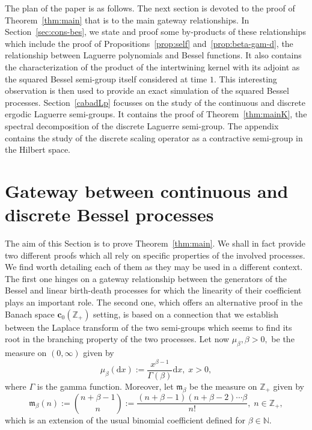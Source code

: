 \documentclass[10pt]{amsart}
\theoremstyle{definition}\newtheorem{defi}[theo]{Definition}\newtheorem{rema}[theo]{Remark}\newtheorem{exam}[theo]{Example}\newtheorem{exem}[theo]{Example}\newtheorem{nota}[theo]{Notation}
\newcommand{\df}{\mathrel{:=}}
\newcommand{\NN}{\mathbb{N}}
\newcommand{\ZZ}{\mathbb{Z}}
\newcommand{\fm}{\mathfrak{m}}
\newcommand{\iy}{\infty}
\newcommand{\esc}{\mathbf{c}}
\newcommand*{\dd}{\mathrm{d}}
\newcommand*{\dx}{\dd x}
\begin{document}
The plan of the paper is as follows. The next section is devoted to the proof of Theorem~\ref{thm:main} that is to the main gateway relationships. In Section~\ref{sec:cons-bes}, we state and proof some by-products of these relationships which include the proof of Propositions~\ref{prop:self} and~\ref{prop:beta-gam-d}, the relationship between Laguerre polynomials and Bessel functions. It also contains the characterization of the product of the intertwining kernel with its adjoint as the squared Bessel semi-group itself considered at time $1$. This interesting observation is then used to provide an exact simulation of the squared Bessel processes. Section~\ref{cabadLp} focusses on the study of the continuous and discrete ergodic Laguerre semi-groups. It contains the proof of Theorem~\ref{thm:mainK}, the spectral decomposition of the discrete Laguerre semi-group. The appendix contains the study of the discrete scaling operator as a contractive semi-group in the Hilbert space.

\section{Gateway between continuous and discrete Bessel processes}\label{cabadBp}

The aim of this Section is to prove Theorem~\ref{thm:main}. We shall in fact provide two different proofs which all rely on specific properties of the involved processes. We find worth detailing each of them as they may be used in a different context. The first one hinges on a gateway relationship between the generators of the Bessel and linear birth-death processes for which the linearity of their coefficient plays an important role. The second one, which offers an alternative proof in the Banach space $\esc_0(\ZZ_+)$ setting, is based on a connection that we establish between the Laplace transform of the two semi-groups which seems to find its root in the branching property of the two processes. Let now $\mu_{\beta}, \beta>0,$ be the measure on $(0,\iy)$ given by
\[
\mu_{\beta}(\dx)\df \frac{x^{\beta-1}}{\Gamma(\beta)}\dx, \; x>0,
\]
where $\Gamma$ is the gamma function. Moreover, let $\fm_{\beta}$ be the measure on $\ZZ_+$ given by
\begin{equation}\label{mbe}
\fm_{\beta}(n)\df\binom{n+\beta-1}{n}\df \frac{(n+\beta-1)(n+\beta-2)\cdots \beta}{n!}, \; n\in\ZZ_+,
\end{equation}
which is an extension of the usual binomial coefficient defined for $\beta\in\NN$.
\end{document}
